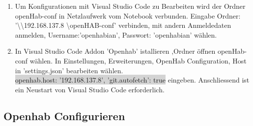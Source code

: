 \begin{enumerate}
\item Um Konfigurationen mit Visual Studio Code zu Bearbeiten wird der Ordner openHab-conf in Netzlaufwerk vom Notebook verbunden. Eingabe Ordner: '\textbackslash \textbackslash 192.168.137.8 \textbackslash openHAB-conf' verbinden, mit andern Anmeldedaten anmelden, Username:'openhabian', Passwort: 'openhabian' wählen.

\item In Visual Studio Code Addon 'Openhab' istallieren ,Ordner öffnen openHab-conf wählen. In Einstellungen, Erweiterungen, OpenHab Configuration, Host in 'settings.json' bearbeiten wählen. \\
\colorbox{lightgray}{openhab.host: '192.168.137.8',
	'git.autofetch': true} eingeben. Anschliessend ist ein Neustart von Visual Studio Code erforderlich.
   
   
 \end{enumerate}
\subsection{Openhab Configurieren}

